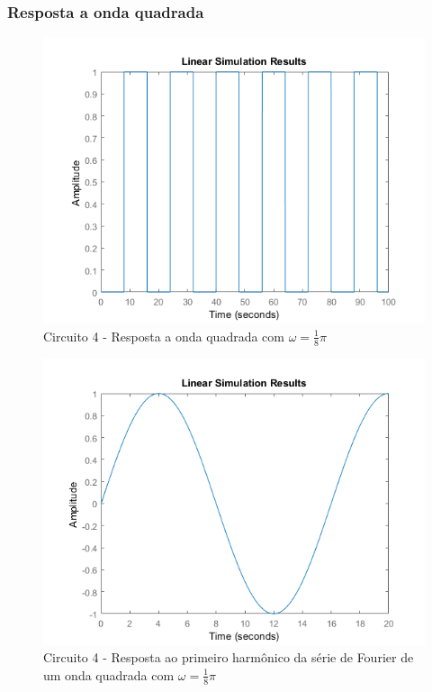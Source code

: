 \documentclass[a4paper, 12pt]{article}
\begin{document}
			\subsubsection{Resposta a onda quadrada}
			\begin{figure}[!ht]
				\centering
				\includegraphics[scale=0.71]{img/1i_circ4.png}
				\caption{Circuito 4 - Resposta a onda quadrada com $\omega = \frac{1}{8}\pi$}	
			\end{figure}			
			\begin{figure}[!ht]
				\centering
				\includegraphics[scale=0.71]{img/1j_circ4.png}
				\caption{Circuito 4 - Resposta ao primeiro harmônico da série de Fourier de um onda quadrada com $\omega = \frac{1}{8}\pi$}	
			\end{figure}		
\end{document}
